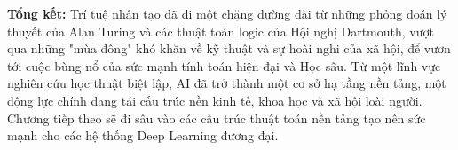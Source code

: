 \vspace{1cm}
\textbf{Tổng kết:}
Trí tuệ nhân tạo đã đi một chặng đường dài từ những phỏng đoán lý thuyết của Alan Turing và các thuật toán logic của Hội nghị Dartmouth, vượt qua những "mùa đông" khó khăn về kỹ thuật và sự hoài nghi của xã hội, để vươn tới cuộc bùng nổ của sức mạnh tính toán hiện đại và Học sâu. Từ một lĩnh vực nghiên cứu học thuật biệt lập, AI đã trở thành một cơ sở hạ tầng nền tảng, một động lực chính đang tái cấu trúc nền kinh tế, khoa học và xã hội loài người. Chương tiếp theo sẽ đi sâu vào các cấu trúc thuật toán nền tảng tạo nên sức mạnh cho các hệ thống Deep Learning đương đại.
